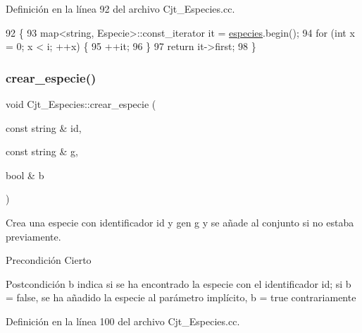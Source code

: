 Definición en la línea 92 del archivo Cjt\+\_\+\+Especies.\+cc.


\begin{DoxyCode}
92                                                     \{
93   map<string, Especie>::const\_iterator it = \hyperlink{class_cjt___especies_a8f319699bd2e8a42b85ec47b67c17563}{especies}.begin();
94   \textcolor{keywordflow}{for} (\textcolor{keywordtype}{int} x = 0; x < i; ++x) \{
95     ++it;
96   \}
97   \textcolor{keywordflow}{return} it->first;
98 \}
\end{DoxyCode}
\mbox{\label{class_cjt___especies_a9f4f280a276c325a609d469bfae7de93}} 
\subsubsection{\texorpdfstring{crear\+\_\+especie()}{crear\_especie()}}
{\footnotesize\ttfamily void Cjt\+\_\+\+Especies\+::crear\+\_\+especie (\begin{DoxyParamCaption}\item[{const string \&}]{id,  }\item[{const string \&}]{g,  }\item[{bool \&}]{b }\end{DoxyParamCaption})}



Crea una especie con identificador id y gen g y se añade al conjunto si no estaba previamente. 

\begin{DoxyPrecond}{Precondición}
Cierto 
\end{DoxyPrecond}
\begin{DoxyPostcond}{Postcondición}
b indica si se ha encontrado la especie con el identificador id; si b = false, se ha añadido la especie al parámetro implícito, b = true contrariamente 
\end{DoxyPostcond}


Definición en la línea 100 del archivo Cjt\+\_\+\+Especies.\+cc.


